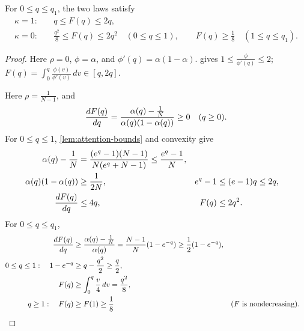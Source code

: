 \begin{lemma}
\label{lem:primitive-bounds}
For $0\le q\le q_1$, the two laws satisfy
\begin{align}
 \kappa=1:\quad &q\le F(q)\le2q,\label{eq:ordinary-primitive-bounds}\\
 \kappa=0:\quad &\frac{q^2}{8}\le F(q)\le2q^2\quad(0\le q\le1),\qquad
 F(q)\ge\frac{1}{8}\quad(1\le q\le q_1).
 \label{eq:cancelled-primitive-bounds}
\end{align}
\end{lemma}
\begin{proof}

Here $\rho=0$, $\phi=\alpha$, and $\phi'(q)=\alpha(1-\alpha)$.
 gives $1\le \tfrac{\phi}{\phi'(q)}\le2$;
$F(q)=\int_0^q\tfrac{\phi(v)}{\phi'(v)}\,dv\in[q,2q]$.


Here $\rho=\tfrac{1}{N-1}$, and
\[
 \frac{d F(q)}{d q}=\frac{\alpha(q)-\frac{1}{N}}{\alpha(q)(1-\alpha(q))}\ge0\quad(q\ge0).
\]
For $0\le q\le1$, \cref{lem:attention-bounds} and convexity give
\begin{align*}
 \alpha(q)-\frac{1}{N}
 &=\frac{(e^q-1)(N-1)}{N(e^q+N-1)}\le\frac{e^q-1}{N},\\
 \alpha(q)(1-\alpha(q))&\ge\frac{1}{2N},&
 e^q-1&\le(e-1)q\le2q,\\
 \frac{d F(q)}{d q}&\le4q,&F(q)&\le2q^2.
\end{align*}
For $0\le q\le q_1$,
\begin{align*}
 \frac{d F(q)}{d q}&\ge\frac{\alpha(q)-\frac{1}{N}}{\alpha(q)}
 =\frac{N-1}{N}(1-e^{-q})\ge\frac{1}{2}(1-e^{-q}),\\
 0\le q\le1:\quad
 1-e^{-q}&\ge q-\frac{q^2}{2}\ge \frac{q}{2},\\
 F(q)&\ge\int_0^q \frac{v}{4}\,dv=\frac{q^2}{8},\\
 q\ge1:\quad F(q)&\ge F(1)\ge\frac{1}{8}&&\text{($F$ is nondecreasing)}.\qedhere
\end{align*}
\end{proof}

